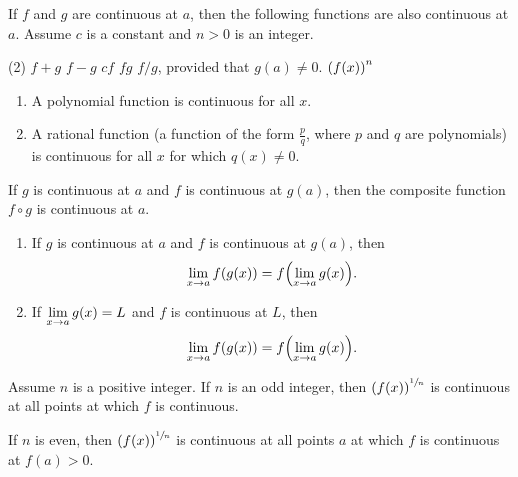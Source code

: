 \documentclass{exam}
\begin{document}
  \begin{thmBox*}
    
  If $f$ and $g$ are continuous at $a$, then the following functions are also continuous at $a$. Assume $c$ is a constant and $n>0$ is an integer.
    \begin{tasks}(2)
      \task $f+g$
      \task $f-g$
      \task $cf$
      \task $fg$
      \task $f/g$, provided that $g(a)\neq 0$.
      \task ${\left(f(x)\right)}^n$
    \end{tasks}
  \end{thmBox*}

  \begin{thmBox*}
    \begin{enumerate}[label=\alph*)]
      \item A polynomial function is continuous for all $x$.
      \item A rational function (a function of the form $\frac{p}{q}$, where $p$ and $q$ are polynomials) is continuous for all $x$ for which $q(x)\neq 0$.
    \end{enumerate}
    \vspace*{-\baselineskip}
  \end{thmBox*}

  \begin{thmBox*}
    If $g$ is continuous at $a$ and $f$ is continuous at $g(a)$, then the composite function $f\circ g$ is continuous at $a$.
  \end{thmBox*}

  \begin{thmBox*}
    \begin{enumerate}
      \item If $g$ is continuous at $a$ and $f$ is continuous at $g(a)$, then
        $$\lim_{x \to a} f{\left(g(x)\right)}=f{\left(\lim_{x \to a} g(x)\right)}.$$
      \item If $\displaystyle\lim_{x \to a} g(x)=L$ and $f$ is continuous at $L$, then
        $$\lim_{x \to a} f{\left(g(x)\right)}=f{\left(\lim_{x \to a}g(x)\right)}.$$
    \end{enumerate}
    \vspace*{-\baselineskip}
  \end{thmBox*}

  \begin{thmBox*}
    Assume $n$ is a positive integer. If $n$ is an odd integer, then ${\left(f(x)\right)}^{\sfrac{1}{n}}$ is continuous at all points at which $f$ is continuous.

    If $n$ is even, then ${\left(f(x)\right)}^{\sfrac{1}{n}}$ is continuous at all points $a$ at which $f$ is continuous at $f(a)>0$.
  \end{thmBox*}    
\end{document}
